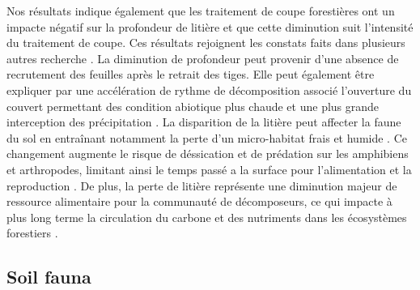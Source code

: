 Nos résultats indique également que les traitement de coupe forestières ont un impacte négatif sur la profondeur de litière et que cette diminution suit l'intensité du traitement de coupe.
Ces résultats rejoignent les constats faits dans plusieurs autres recherche \citep{Marshall2000Impactsforest,Mazerolle2021Woodlandsalamander}. 
La diminution de profondeur peut provenir d'une absence de recrutement des feuilles après le retrait des tiges. 
Elle peut également être expliquer par une accélération de rythme de décomposition associé l'ouverture du couvert permettant des condition abiotique plus chaude et une plus grande interception des précipitation \citep{Fierer2005LitterQuality,Butenschoen2011Interactiveeffects,Ameray2021Forestcarbon}. 
La disparition de la litière peut affecter la faune du sol en entraînant notamment la perte d'un micro-habitat frais et humide \citep{Spotila1972Roletemperature,Grover1998Influencecover,Niemela2007effectsforestry}. 
Ce changement augmente le risque de déssication et de prédation sur les amphibiens et arthropodes, limitant ainsi le temps passé a la surface pour l'alimentation et la reproduction \citep{deMaynadier1995relationshipforest,Koivula1999Leaflitter,Walton2013Topregulationlitter}. 
De plus, la perte de litière représente une diminution majeur de ressource alimentaire pour la communauté de décomposeurs, ce qui impacte à plus long terme la circulation du carbone et des nutriments dans les écosystèmes forestiers \citep{Handa2014Consequencesbiodiversity}.





\subsection*{Soil fauna}
\label{disc:soil_fauna}


